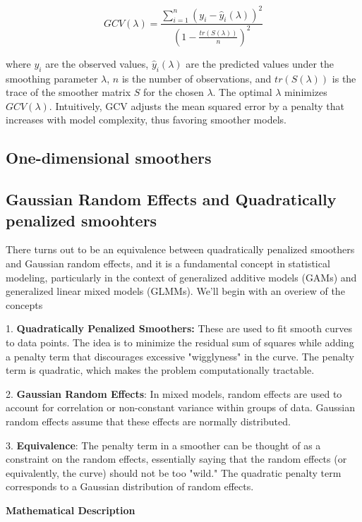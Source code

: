 \documentclass[12pt, twoside,hidelinks]{article}
\theoremstyle{definition}
\numberwithin{equation}{section}
\begin{document}
\[
GCV(\lambda) = \frac{\sum_{i=1}^{n} (y_i - \hat{y}_i(\lambda))^2}{(1 - \frac{tr(S(\lambda))}{n})^2}
\]

where \(y_i\) are the observed values, \(\hat{y}_i(\lambda)\) are the predicted values under the smoothing parameter \(\lambda\), \(n\) is the number of observations, and \(tr(S(\lambda))\) is the trace of the smoother matrix \(S\) for the chosen \(\lambda\). The optimal \(\lambda\) minimizes \(GCV(\lambda)\). Intuitively, GCV adjusts the mean squared error by a penalty that increases with model complexity, thus favoring smoother models.


\subsection{One-dimensional smoothers}

\subsection{Gaussian Random Effects and Quadratically penalized smoohters}

There turns out to be an equivalence between quadratically penalized smoothers and Gaussian random effects, and it is a fundamental concept in statistical modeling, particularly in the context of generalized additive models (GAMs) and generalized linear mixed models (GLMMs). We'll begin with an overiew of the concepts
\newline

1. \textbf{Quadratically Penalized Smoothers:} These are used to fit smooth curves to data points. The idea is to minimize the residual sum of squares while adding a penalty term that discourages excessive "wigglyness" in the curve. The penalty term is quadratic, which makes the problem computationally tractable.

2. \textbf{Gaussian Random Effects}: In mixed models, random effects are used to account for correlation or non-constant variance within groups of data. Gaussian random effects assume that these effects are normally distributed.

3. \textbf{Equivalence}: The penalty term in a smoother can be thought of as a constraint on the random effects, essentially saying that the random effects (or equivalently, the curve) should not be too "wild." The quadratic penalty term corresponds to a Gaussian distribution of random effects.
\newline

\textbf{Mathematical Description}
\end{document}
